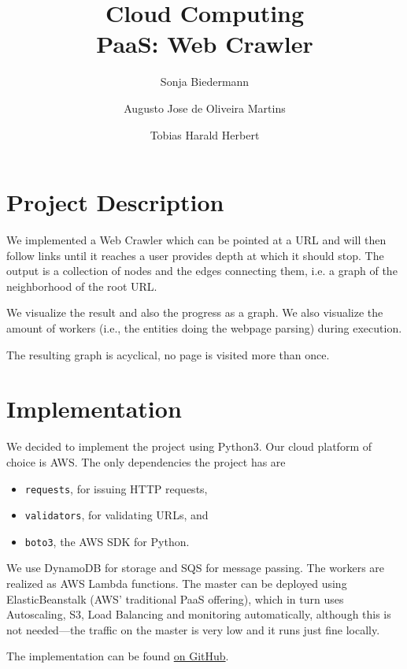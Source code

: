 \documentclass[english]{scrartcl}
\begin{document}
\title{Cloud Computing\\PaaS: Web Crawler}

\author{Sonja Biedermann \and Augusto Jose de Oliveira Martins \and Tobias Harald Herbert}

\maketitle
\tableofcontents

\section{Project Description}

We implemented a Web Crawler which can be pointed at a URL and will then follow
links until it reaches a user provides depth at which it should stop. The
output is a collection of nodes and the edges connecting them, i.e. a graph of
the neighborhood of the root URL.

We visualize the result and also the progress as a graph. We also visualize
the amount of workers (i.e., the entities doing the webpage parsing) during
execution.

The resulting graph is acyclical, no page is visited more than once.

\section{Implementation}

We decided to implement the project using Python3. Our cloud platform of choice
is AWS. The only dependencies the project has are

\begin{itemize}
    \item \texttt{requests}, for issuing HTTP requests,
    \item \texttt{validators}, for validating URLs, and
    \item \texttt{boto3}, the AWS SDK for Python.
\end{itemize}

We use DynamoDB for storage and SQS for message passing. The workers are realized
as AWS Lambda functions. The master can be deployed using ElasticBeanstalk (AWS'
traditional PaaS offering), which in turn uses Autoscaling, S3, Load Balancing
and monitoring automatically, although this is not needed---the traffic on the
master is very low and it runs just fine locally.

The implementation can be found \href{https://github.com/biederfrau/cloud-computing-paas}{on GitHub}.
\end{document}
